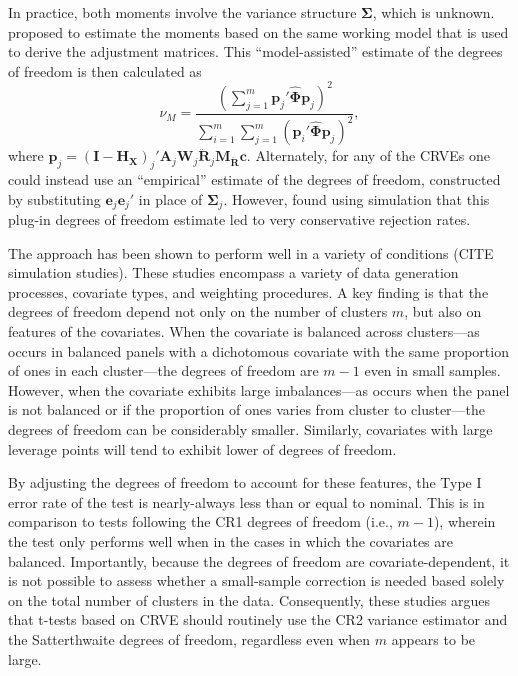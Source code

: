 \documentclass[12pt]{article}
\newcommand{\bm}{\mathbf}
\newcommand{\bs}{\boldsymbol}
\begin{document}
In practice, both moments involve the variance structure $\bs\Sigma$, which is unknown. 
\citet{Bell2002bias} proposed to estimate the moments based on the same working model that is used to derive the adjustment matrices. 
This ``model-assisted'' estimate of the degrees of freedom is then calculated as 
\begin{equation}
\label{eq:nu_model}
\nu_{M} = \frac{\left(\sum_{j=1}^m \bm{p}_j' \hat{\bs\Phi} \bm{p}_j\right)^2}{\sum_{i=1}^m \sum_{j=1}^m \left(\bm{p}_i' \hat{\bs\Phi} \bm{p}_j\right)^2},
\end{equation}
where $\bm{p}_j = \left(\bm{I} - \bm{H_X}\right)_j'\bm{A}_j \bm{W}_j\bm{\ddot{R}}_j\bm{M_{\ddot{R}}} \bm{c}$.
Alternately, for any of the CRVEs one could instead use an ``empirical'' estimate of the degrees of freedom, constructed by substituting $\bm{e}_j \bm{e}_j'$ in place of $\bs\Sigma_j$. 
However, \citet{Bell2002bias} found using simulation that this plug-in degrees of freedom estimate led to very conservative rejection rates. 

The \citet{Bell2002bias} approach has been shown to perform well in a variety of conditions (CITE simulation studies). 
These studies encompass a variety of data generation processes, covariate types, and weighting procedures. 
A key finding is that the degrees of freedom depend not only on the number of clusters $m$, but also on features of the covariates. 
When the covariate is balanced across clusters---as occurs in balanced panels with a dichotomous covariate with the same proportion of ones in each cluster---the degrees of freedom are $m - 1$ even in small samples. 
However, when the covariate exhibits large imbalances---as occurs when the panel is not balanced or if the proportion of ones varies from cluster to cluster---the degrees of freedom can be considerably smaller. 
Similarly, covariates with large leverage points will tend to exhibit lower of degrees of freedom. 


By adjusting the degrees of freedom to account for these features, the Type I error rate of the test is nearly-always less than or equal to nominal. 
This is in comparison to tests following the CR1 degrees of freedom (i.e., $m - 1$), wherein the test only performs well when in the cases in which the covariates are balanced.
Importantly, because the degrees of freedom are covariate-dependent, it is not possible to assess whether a small-sample correction is needed based solely on the total number of clusters in the data. 
Consequently, these studies argues that t-tests based on CRVE should routinely use the CR2 variance estimator and the Satterthwaite degrees of freedom, regardless even when $m$ appears to be large.
\end{document}
